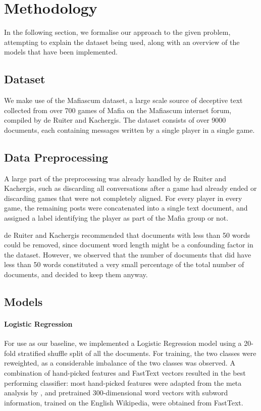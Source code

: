 \documentclass[11pt,a4paper]{article}
\begin{document}
\section{Methodology}

In the following section, we formalise our approach to the given problem, attempting to explain the dataset being used, along with an overview of the models that have been implemented.

\subsection{Dataset}

We make use of the Mafiascum dataset, a large scale source of deceptive text collected from over 700 games of Mafia on the Mafiascum internet forum, compiled by de Ruiter and Kachergis. The dataset consists of over 9000 documents, each containing messages written by a single player in a single game.

\subsection{Data Preprocessing}

A large part of the preprocessing was already handled by de Ruiter and Kachergis, such as discarding all conversations after a game had already ended or discarding games that were not completely aligned. For every player in every game, the remaining posts were concatenated into a single text document, and assigned a label identifying the player as part of the Mafia group or not.

de Ruiter and Kachergis recommended that documents with less than 50 words could be removed, since document word length might be a confounding factor in the dataset. However, we observed that the number of documents that did have less than 50 words constituted a very small percentage of the total number of documents, and decided to keep them anyway. 

\subsection{Models}

\paragraph{Logistic Regression} For use as our baseline, we implemented a Logistic Regression model using a 20-fold stratified shuffle split of all the documents. For training, the two classes were reweighted, as a considerable imbalance of the two classes was observed. A combination of hand-picked features and FastText vectors resulted in the best performing classifier: most hand-picked features were adapted from the meta analysis by \citet{Hauch}, and pretrained 300-dimensional word vectors with subword information, trained on the English Wikipedia, were obtained from FastText.
\end{document}
